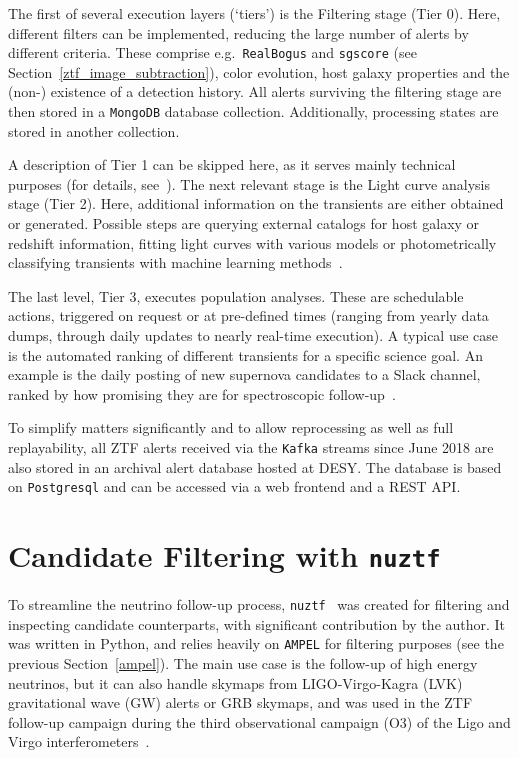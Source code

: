 The first of several execution layers (`tiers') is the Filtering stage (Tier 0). Here, different filters can be implemented, reducing the large number of alerts by different criteria. These comprise e.g.\ \texttt{RealBogus} and \texttt{sgscore} (see Section~\ref{ztf_image_subtraction}), color evolution, host galaxy properties and the (non-) existence of a detection history. All alerts surviving the filtering stage are then stored in a \texttt{MongoDB} database collection. Additionally, processing states are stored in another collection.

A description of Tier 1 can be skipped here, as it serves mainly technical purposes (for details, see~\cite{Nordin2019}). The next relevant stage is the Light curve analysis stage (Tier 2). Here, additional information on the transients are either obtained or generated. Possible steps are querying external catalogs for host galaxy or redshift information, fitting light curves with various models or photometrically classifying transients with machine learning methods~\cite{Nordin2019}.

The last level, Tier 3, executes population analyses. These are schedulable actions, triggered on request or at pre-defined times (ranging from yearly data dumps, through daily updates to nearly real-time execution). A typical use case is the automated ranking of different transients for a specific science goal. An example is the daily posting of new supernova candidates to a Slack channel, ranked by how promising they are for spectroscopic follow-up~\cite{Nordin2019}.

To simplify matters significantly and to allow reprocessing as well as full replayability, all ZTF alerts received via the \texttt{Kafka} streams since June 2018 are also stored in an archival alert database hosted at DESY. The database is based on \texttt{Postgresql} and can be accessed via a web frontend and a REST API.

\section{Candidate Filtering with \texttt{nuztf}}
To streamline the neutrino follow-up process, \texttt{nuztf}~ was created for filtering and inspecting candidate counterparts, with significant contribution by the author. It was written in Python, and relies heavily on \texttt{AMPEL} for filtering purposes (see the previous Section~\ref{ampel}). The main use case is the follow-up of high energy neutrinos, but it can also handle skymaps from LIGO-Virgo-Kagra (LVK) gravitational wave (GW) alerts or GRB skymaps, and was used in the ZTF follow-up campaign during the third observational campaign (O3) of the Ligo and Virgo interferometers~\cite{Kasliwal2020}.


